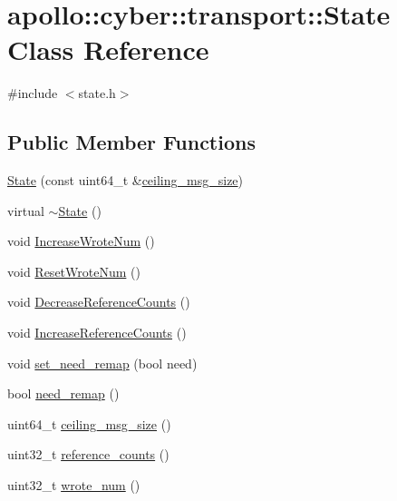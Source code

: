 \hypertarget{classapollo_1_1cyber_1_1transport_1_1State}{\section{apollo\-:\-:cyber\-:\-:transport\-:\-:State Class Reference}
\label{classapollo_1_1cyber_1_1transport_1_1State}
}


{\ttfamily \#include $<$state.\-h$>$}

\subsection*{Public Member Functions}
\begin{DoxyCompactItemize}
\item 
\hyperlink{classapollo_1_1cyber_1_1transport_1_1State_a8117eb864cbff83ae76ef6419fdac008}{State} (const uint64\-\_\-t \&\hyperlink{classapollo_1_1cyber_1_1transport_1_1State_a980bab14ee9d5faa23eaa900068e3cac}{ceiling\-\_\-msg\-\_\-size})
\item 
virtual \hyperlink{classapollo_1_1cyber_1_1transport_1_1State_a03c17c7f20aea3f065506721ba5af3ff}{$\sim$\-State} ()
\item 
void \hyperlink{classapollo_1_1cyber_1_1transport_1_1State_a262eb05ecda2755a7f217a95b1796781}{Increase\-Wrote\-Num} ()
\item 
void \hyperlink{classapollo_1_1cyber_1_1transport_1_1State_a50600c0127c2078d8c7570956722c2a0}{Reset\-Wrote\-Num} ()
\item 
void \hyperlink{classapollo_1_1cyber_1_1transport_1_1State_ab1c814d14a6b1d5f667ed097ac80e957}{Decrease\-Reference\-Counts} ()
\item 
void \hyperlink{classapollo_1_1cyber_1_1transport_1_1State_af698200fc34613e7384b178be4df771d}{Increase\-Reference\-Counts} ()
\item 
void \hyperlink{classapollo_1_1cyber_1_1transport_1_1State_a8836b00750bbadc2a7671647eaca7d55}{set\-\_\-need\-\_\-remap} (bool need)
\item 
bool \hyperlink{classapollo_1_1cyber_1_1transport_1_1State_a67fd8abb622e18917a49cf6fde8262b6}{need\-\_\-remap} ()
\item 
uint64\-\_\-t \hyperlink{classapollo_1_1cyber_1_1transport_1_1State_a980bab14ee9d5faa23eaa900068e3cac}{ceiling\-\_\-msg\-\_\-size} ()
\item 
uint32\-\_\-t \hyperlink{classapollo_1_1cyber_1_1transport_1_1State_a3feb19b73e1ef2acd773fc63101b6445}{reference\-\_\-counts} ()
\item 
uint32\-\_\-t \hyperlink{classapollo_1_1cyber_1_1transport_1_1State_ac8b8445a344578d5b68288f90be2282a}{wrote\-\_\-num} ()
\end{DoxyCompactItemize}
